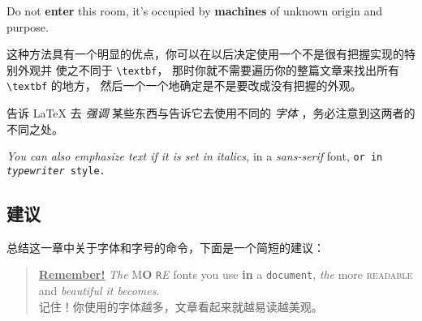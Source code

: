 \begin{example}
\newcommand{\oops}[1]{%
 \textbf{#1}}
Do not \oops{enter} this room,
it's occupied by \oops{machines}
of unknown origin and purpose.
\end{example}

这种方法具有一个明显的优点，你可以在以后决定使用一个不是很有把握实现的特别外观并
使之不同于 \verb|\textbf|，
那时你就不需要遍历你的整篇文章来找出所有 \verb|\textbf| 的地方，
然后一个一个地确定是不是要改成没有把握的外观。

告诉 \LaTeX{} 去 \emph{强调} 某些东西与告诉它去使用不同的 \emph{字体} ，务必注意到这两者的不同之处。
\begin{example}
	\textit{You can also
		\emph{emphasize} text if 
		it is set in italics,}
	\textsf{in a 
		\emph{sans-serif} font,}
	\texttt{or in 
		\emph{typewriter} style.}
\end{example}
\subsection{建议}

总结这一章中关于字体和字号的命令，下面是一个简短的建议：\nopagebreak
\begin{quote}
 \underline{\textbf{Remember\Huge!}} \textit{The}
 \textsf{M\textbf{\LARGE O} \texttt{R}\textsl{E}} fonts \Huge you
 \tiny use \footnotesize \textbf{in} a \small \texttt{document},
 \large \textit{the} \normalsize more \textsc{readable} and
 \textsl{\textsf{beautiful} it bec\large o\Large m\LARGE e\huge s}.\\
 记住！你使用的字体越多，文章看起来就越易读越美观。
\end{quote}

